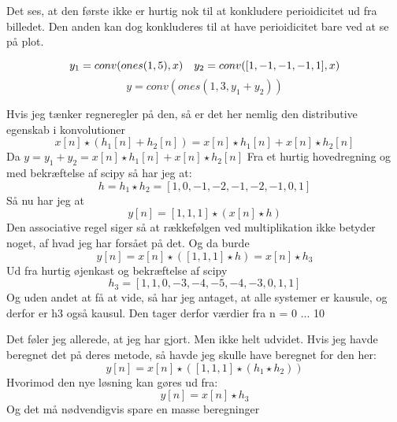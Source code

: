 \begin{Opgaver}
\begin{kapitel}
\begin{Opgave}
        Det ses, at den første ikke er hurtig nok til at konkludere perioidicitet ud fra billedet. 
        Den anden kan dog konkluderes til at have perioidicitet bare ved at se på plot. 
        \end{Opgave}

        \begin{Opgave}
            \[y_1 = conv(ones(1, 5), x)\quad y_2 = conv([1, -1, -1, -1, 1], x)\]
            \[y = conv(ones(1, 3, y_1 + y_2))\]
            \begin{UnderOpgave}[Givet ovenstående find så det ækvivalente system hvor at $y=conv(h, x)$]
                Hvis jeg tænker regneregler på den, så er det her nemlig den distributive egenskab i konvolutioner
                \[x[n] \star (h_1[n] + h_2[n]) = x[n] \star h_1[n] + x[n] \star h_2[n]\]
                Da $y = y_1 + y_2 = x[n] \star h_1[n] + x[n] \star h_2[n]$
                Fra et hurtig hovedregning og med bekræftelse af scipy så har jeg at: 
                \[h = h_1 \star h_2 = [1, 0, -1, -2, -1, -2, -1, 0, 1]\]
                Så nu har jeg at
                \[y[n] = [1, 1, 1] \star (x[n] \star h)\]
                Den associative regel siger så at rækkefølgen ved multiplikation ikke betyder noget, af hvad jeg har forsået på det. 
                Og da burde
                \[y[n] = x[n] \star ([1, 1, 1] \star h) = x[n] \star h_3\]
                Ud fra hurtig øjenkast og bekræftelse af scipy
                \[h_3 = [1, 1, 0, -3, -4, -5, -4, -3, 0, 1, 1]\]
                Og uden andet at få at vide, så har jeg antaget, at alle systemer er kausule, og derfor er h3 også kausul. 
                Den tager derfor værdier fra n = 0 ... 10
            \end{UnderOpgave}
            \begin{UnderOpgave}
                Det føler jeg allerede, at jeg har gjort. Men ikke helt udvidet. 
                Hvis jeg havde beregnet det på deres metode, så havde jeg skulle have beregnet for den her: 
                \[y[n] = x[n] \star ([1, 1, 1] \star (h_1 \star h_2))\]
                Hvorimod den nye løsning kan gøres ud fra: 
                \[y[n] = x[n] \star h_3\]
                Og det må nødvendigvis spare en masse beregninger
            \end{UnderOpgave}

        \end{Opgave}


\end{kapitel}
\end{Opgaver}
